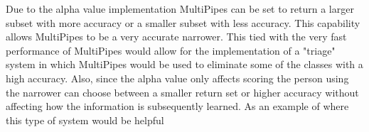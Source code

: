 Due to the alpha value implementation MultiPipes can be set to return a larger subset with more accuracy or a smaller subset with less accuracy. This capability allows MultiPipes to be a very accurate narrower. This tied with the very fast performance of MultiPipes would allow for the implementation of a "triage" system in which MultiPipes would be used to eliminate some of the classes with a high accuracy. Also, since the alpha value only affects scoring the person using the narrower can choose between a smaller return set or higher accuracy without affecting how the information is subsequently learned. As an example of where this type of system would be helpful
